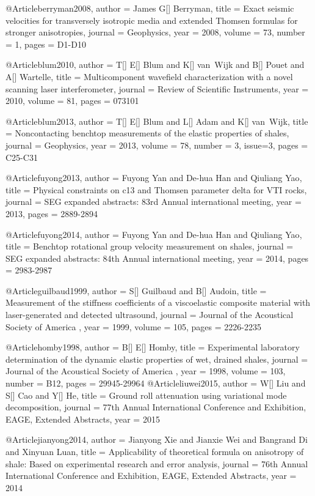 @Article{berryman2008,
  author = 	 {James G[] Berryman},
  title = 	 {Exact seismic velocities for transversely isotropic media and extended Thomsen formulas for stronger anisotropies},
  journal = 	 {Geophysics},
  year = 	 2008,
  volume = 	 73,
  number = 	 1,
  pages = 	 {D1-D10}}

@Article{blum2010,
  author = 	 {T[] E[] Blum and K[] van~Wijk and B[] Pouet and A[] Wartelle},
  title = 	 {Multicomponent wavefield characterization with a novel scanning laser interferometer},
  journal = 	 {Review of Scientific Instruments},
  year = 	 2010,
  volume = 	 81,
  pages = 	 {073101}}

@Article{blum2013,
  author = 	 {T[] E[] Blum and L[] Adam and K[] van~Wijk},
  title = 	 {Noncontacting benchtop measurements of the elastic properties of shales},
  journal = 	 {Geophysics},
  year = 	 2013,
  volume = 	 78,
  number = 	 3,
  issue=3,
  pages = 	 {C25-C31}}

@Article{fuyong2013,
  author = 	 {Fuyong Yan and De-hua Han and Qiuliang Yao},
  title = 	 {Physical constraints on c13 and Thomsen parameter delta for VTI rocks},
  journal = 	 {SEG expanded abstracts: 83rd Annual international meeting},
  year = 	 2013,
  pages = 	 {2889-2894}}

@Article{fuyong2014,
  author = 	 {Fuyong Yan and De-hua Han and Qiuliang Yao},
  title = 	 {Benchtop rotational group velocity measurement on shales},
  journal = 	 {SEG expanded abstracts: 84th Annual international meeting},
  year = 	 2014,
  pages = 	 {2983-2987}}

@Article{guilbaud1999,
  author = 	 {S[] Guilbaud and B[] Audoin},
  title = 	 {Measurement of the stiffness coefficients of a viscoelastic composite material with laser-generated and detected ultrasound},
  journal = 	 { Journal of the Acoustical Society of America },
  year = 	 1999,
  volume = 	 105,
  pages = 	 {2226-2235}}

@Article{homby1998,
  author = 	 {B[] E[] Homby},
  title = 	 {Experimental laboratory determination of the dynamic elastic properties of wet, drained shales},
  journal = 	 { Journal of the Acoustical Society of America },
  year = 	 1998,
  volume = 	 103,
  number = B12,
  pages = 	 {29945-29964}}
@Article{liuwei2015,
  author = 	 {W[] Liu and S[] Cao and Y[] He},
  title = 	 {Ground roll attenuation using variational mode decomposition},
  journal = 	 { 77th Annual International Conference and Exhibition, EAGE, Extended Abstracts},
  year = 	 2015}

  
@Article{jianyong2014,
  author = 	 {Jianyong Xie and Jianxie Wei and Bangrand Di and Xinyuan Luan},
  title = 	 {Applicability of theoretical formula on anisotropy of shale: Based on experimental research and error analysis},
  journal = 	 { 76th Annual International Conference and Exhibition, EAGE, Extended Abstracts},
  year = 	 2014}

